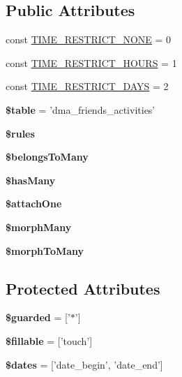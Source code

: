 \subsection*{Public Attributes}
\begin{DoxyCompactItemize}
\item 
const \hyperlink{classDMA_1_1Friends_1_1Models_1_1Activity_ab9dd8b18c4810beabdcf8e45039913c8}{T\+I\+M\+E\+\_\+\+R\+E\+S\+T\+R\+I\+C\+T\+\_\+\+N\+O\+N\+E} = 0
\item 
const \hyperlink{classDMA_1_1Friends_1_1Models_1_1Activity_ac78040e8784e02c2d1bcce5221ac6cb8}{T\+I\+M\+E\+\_\+\+R\+E\+S\+T\+R\+I\+C\+T\+\_\+\+H\+O\+U\+R\+S} = 1
\item 
const \hyperlink{classDMA_1_1Friends_1_1Models_1_1Activity_a71b85478f20cda144aeffe010364a0f7}{T\+I\+M\+E\+\_\+\+R\+E\+S\+T\+R\+I\+C\+T\+\_\+\+D\+A\+Y\+S} = 2
\item 
\hypertarget{classDMA_1_1Friends_1_1Models_1_1Activity_a2ded517047c73d831aef535c8adc6690}{{\bfseries \$table} = 'dma\+\_\+friends\+\_\+activities'}\label{classDMA_1_1Friends_1_1Models_1_1Activity_a2ded517047c73d831aef535c8adc6690}

\item 
{\bfseries \$rules}
\item 
{\bfseries \$belongs\+To\+Many}
\item 
{\bfseries \$has\+Many}
\item 
{\bfseries \$attach\+One}
\item 
{\bfseries \$morph\+Many}
\item 
{\bfseries \$morph\+To\+Many}
\end{DoxyCompactItemize}
\subsection*{Protected Attributes}
\begin{DoxyCompactItemize}
\item 
\hypertarget{classDMA_1_1Friends_1_1Models_1_1Activity_ac82a10f722788b5c1c7a5295e1ac10c2}{{\bfseries \$guarded} = \mbox{[}'$\ast$'\mbox{]}}\label{classDMA_1_1Friends_1_1Models_1_1Activity_ac82a10f722788b5c1c7a5295e1ac10c2}

\item 
\hypertarget{classDMA_1_1Friends_1_1Models_1_1Activity_ab2a7401215dff9dfd8b600247b12454a}{{\bfseries \$fillable} = \mbox{[}'touch'\mbox{]}}\label{classDMA_1_1Friends_1_1Models_1_1Activity_ab2a7401215dff9dfd8b600247b12454a}

\item 
\hypertarget{classDMA_1_1Friends_1_1Models_1_1Activity_afe94503fbf177345e4bf0b1625dee499}{{\bfseries \$dates} = \mbox{[}'date\+\_\+begin', 'date\+\_\+end'\mbox{]}}\label{classDMA_1_1Friends_1_1Models_1_1Activity_afe94503fbf177345e4bf0b1625dee499}

\end{DoxyCompactItemize}


